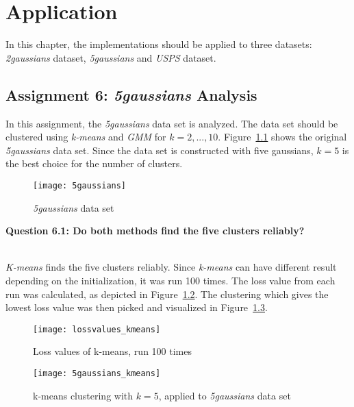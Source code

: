 \chapter{Application}
\label{chap:application}

In this chapter, the implementations should be applied to three datasets: \textit{2gaussians} dataset, \textit{5gaussians} and \textit{USPS} dataset.

\section{Assignment 6: \textit{5gaussians} Analysis}
\label{assignment6}

In this assignment, the \textit{5gaussians} data set is analyzed. The data set should be clustered using \textit{k-means} and \textit{GMM} for $k = 2, ..., 10$. Figure~\ref{fig:5gaussians} shows the original \textit{5gaussians} data set. Since the data set is constructed with five gaussians, $k=5$ is the best choice for the number of clusters.

\begin{figure}[h!]
	\centering
	\texttt{[image: 5gaussians]}
	\caption{\textit{5gaussians} data set}
	\label{fig:5gaussians}
\end{figure}

{\raggedright \textbf{Question 6.1: Do both methods find the five clusters reliably?}} \\
\textit{K-means} finds the five clusters reliably. Since \textit{k-means} can have different result depending on the initialization, it was run 100 times. The loss value from each run was calculated, as depicted in Figure~\ref{fig:lossvalues_kmeans}. The clustering which gives the lowest loss value was then picked and visualized in Figure~\ref{fig:5gaussians_kmeans}.

\begin{figure}[h!]
	\centering
	\texttt{[image: lossvalues\_kmeans]}
	\caption{Loss values of k-means, run 100 times}
	\label{fig:lossvalues_kmeans}
\end{figure}

\begin{figure}[h!]
	\centering
	\texttt{[image: 5gaussians\_kmeans]}
	\caption{k-means clustering with $k=5$, applied to \textit{5gaussians} data set}
	\label{fig:5gaussians_kmeans}
\end{figure}

